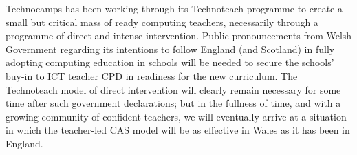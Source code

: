 \documentclass{sig-alternate}
\begin{document}
Technocamps has been working through its Technoteach programme to
create a small but critical mass of ready computing teachers,
necessarily through a programme of direct and intense intervention.
Public pronouncements from Welsh Government regarding its intentions
to follow England (and Scotland) in fully adopting computing education
in schools will be needed to secure the schools' buy-in to ICT teacher
CPD in readiness for the new curriculum.  The Technoteach model of
direct intervention will clearly remain necessary for some time after
such government declarations; but in the fullness of time, and with a
growing community of confident teachers, we will eventually arrive at
a situation in which the teacher-led CAS model will be as effective in
Wales as it has been in England.






\end{document}
